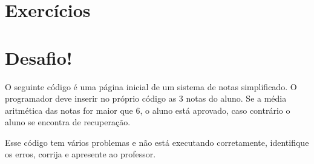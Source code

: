\section{Exercícios}
\label{cap5-exercicios}

\section{Desafio!}
\label{cap5-desafio}
O seguinte código é uma página inicial de um sistema de notas simplificado.
O programador deve inserir no próprio código as 3 notas do aluno. Se a média aritmética 
das notas for maior que 6, o aluno está aprovado, caso contrário o aluno se encontra de 
recuperação.

Esse código tem vários problemas e não está executando corretamente, identifique os erros, 
corrija e apresente ao professor.

